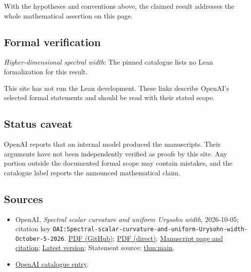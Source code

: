 \documentclass[11pt]{article}
\begin{document}
With the hypotheses and conventions above, the claimed result addresses the whole mathematical assertion on this page.

\subsection{Formal verification}
\textit{Higher-dimensional spectral width}: The pinned catalogue lists no Lean formalization for this result.

This site has not run the Lean development. These links describe OpenAI’s selected formal statements and should be read with their stated scope.

\subsection{Status caveat}
OpenAI reports that an internal model produced the manuscripts. Their arguments have not been independently verified as proofs by this site. Any portion outside the documented formal scope may contain mistakes, and the catalogue label reports the announced mathematical claim.

\subsection{Sources}
\begin{itemize}
\item OpenAI, \emph{Spectral scalar curvature and uniform Urysohn width}, 2026-10-05; citation key \texttt{OAI:Spectral-scalar-curvature-and-uniform-Urysohn-width-October-5-2026}. \href{https://github.com/openai/math/blob/adc7f1241b42e322a6451854ab7e4b4c146bf78a/preprints/Spectral-scalar-curvature-and-uniform-Urysohn-width-October-5-2026/main.pdf}{PDF (GitHub)}; \href{https://github.com/openai/math/raw/adc7f1241b42e322a6451854ab7e4b4c146bf78a/preprints/Spectral-scalar-curvature-and-uniform-Urysohn-width-October-5-2026/main.pdf}{PDF (direct)}; \href{https://github.com/openai/math/blob/adc7f1241b42e322a6451854ab7e4b4c146bf78a/preprints/Spectral-scalar-curvature-and-uniform-Urysohn-width-October-5-2026/README.md}{Manuscript page and citation}; \href{https://github.com/openai/math/blob/main/preprints/Spectral-scalar-curvature-and-uniform-Urysohn-width-October-5-2026/main.pdf}{Latest version}; Statement source: \href{https://github.com/openai/math/blob/adc7f1241b42e322a6451854ab7e4b4c146bf78a/preprints/Spectral-scalar-curvature-and-uniform-Urysohn-width-October-5-2026/build/sections/introduction.tex\#L35}{thm:main}.
\item \href{https://github.com/openai/math/blob/adc7f1241b42e322a6451854ab7e4b4c146bf78a/CONTENTS.md}{OpenAI catalogue entry}.
\end{itemize}
\end{document}
